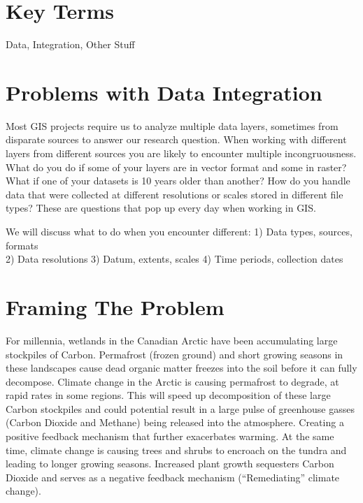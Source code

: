 \documentclass[
]{book}
\begin{document}
\hypertarget{key-terms-15}{%
\section*{Key Terms}\label{key-terms-15}}

Data, Integration, Other Stuff

\hypertarget{problems-with-data-integration}{%
\section{Problems with Data Integration}\label{problems-with-data-integration}}

Most GIS projects require us to analyze multiple data layers, sometimes from disparate sources to answer our research question. When working with different layers from different sources you are likely to encounter multiple incongruousness. What do you do if some of your layers are in vector format and some in raster? What if one of your datasets is 10 years older than another? How do you handle data that were collected at different resolutions or scales stored in different file types? These are questions that pop up every day when working in GIS.

We will discuss what to do when you encounter different:
1) Data types, sources, formats\\
2) Data resolutions
3) Datum, extents, scales
4) Time periods, collection dates

\hypertarget{framing-the-problem}{%
\section{Framing The Problem}\label{framing-the-problem}}

For millennia, wetlands in the Canadian Arctic have been accumulating large stockpiles of Carbon. Permafrost (frozen ground) and short growing seasons in these landscapes cause dead organic matter freezes into the soil before it can fully decompose. Climate change in the Arctic is causing permafrost to degrade, at rapid rates in some regions. This will speed up decomposition of these large Carbon stockpiles and could potential result in a large pulse of greenhouse gasses (Carbon Dioxide and Methane) being released into the atmosphere. Creating a positive feedback mechanism that further exacerbates warming. At the same time, climate change is causing trees and shrubs to encroach on the tundra and leading to longer growing seasons. Increased plant growth sequesters Carbon Dioxide and serves as a negative feedback mechanism (``Remediating'' climate change).
\end{document}
